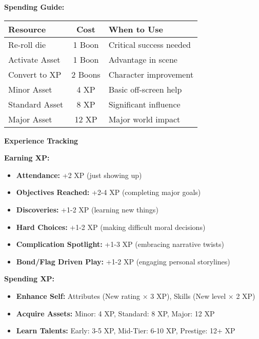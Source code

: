 \documentclass[10pt]{article}
\begin{document}
\begin{mdframed}[backgroundcolor=background, linewidth=0pt]
\begin{adjustwidth}{0.2cm}{0.2cm}
\textbf{Spending Guide:}
\begin{center}
\begin{tabular}{|l|c|l|}
\hline
\cellcolor{lightaccent} \textbf{Resource} & \cellcolor{lightaccent} \textbf{Cost} & \cellcolor{lightaccent} \textbf{When to Use} \\
\hline
Re-roll die & 1 Boon & Critical success needed \\
Activate Asset & 1 Boon & Advantage in scene \\
Convert to XP & 2 Boons & Character improvement \\
Minor Asset & 4 XP & Basic off-screen help \\
Standard Asset & 8 XP & Significant influence \\
Major Asset & 12 XP & Major world impact \\
\hline
\end{tabular}
\end{center}
\end{adjustwidth}

\vspace{0.3cm}

\begin{mdframed}[backgroundcolor=sectionbg, linewidth=1pt, linecolor=accentcolor]
\textbf{\large Experience Tracking}
\end{mdframed}

\begin{adjustwidth}{0.2cm}{0.2cm}
\vspace{0.2cm}
\textbf{Earning XP:}
\begin{itemize}[leftmargin=*]
\item \textbf{Attendance:} +2 XP (just showing up)
\item \textbf{Objectives Reached:} +2-4 XP (completing major goals)
\item \textbf{Discoveries:} +1-2 XP (learning new things)
\item \textbf{Hard Choices:} +1-2 XP (making difficult moral decisions)
\item \textbf{Complication Spotlight:} +1-3 XP (embracing narrative twists)
\item \textbf{Bond/Flag Driven Play:} +1-2 XP (engaging personal storylines)
\end{itemize}

\textbf{Spending XP:}
\begin{itemize}[leftmargin=*]
\item \textbf{Enhance Self:} Attributes (New rating × 3 XP), Skills (New level × 2 XP)
\item \textbf{Acquire Assets:} Minor: 4 XP, Standard: 8 XP, Major: 12 XP
\item \textbf{Learn Talents:} Early: 3-5 XP, Mid-Tier: 6-10 XP, Prestige: 12+ XP
\end{itemize}
\end{adjustwidth}


\end{mdframed}
\end{document}
